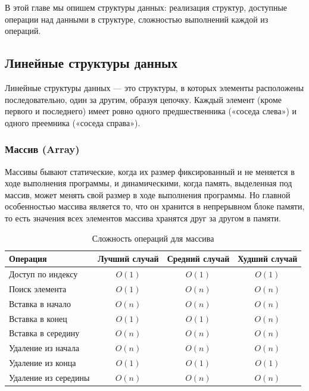 \documentclass[a4paper,12pt]{article}
\begin{document}
В этой главе мы опишем структуры данных: реализация структур, доступные операции над данными в структуре, сложностью выполнений каждой из операций.

\subsection{Линейные структуры данных}
\label{subsec:линейные-структуры-данных}

Линейные структуры данных --- это структуры, в которых элементы расположены последовательно, один за другим, образуя цепочку. Каждый элемент (кроме первого и последнего) имеет ровно одного предшественника («соседа слева») и одного преемника («соседа справа»).

\subsubsection{Массив (Array)}
\label{subsubsec:массив-array}

Массивы бывают статические, когда их размер фиксированный и не меняется в ходе выполнения программы, и динамическими, когда память, выделенная под массив, может менять свой размер в ходе выполнения программы. Но главной особенностью массива является то, что он хранится в непрерывном блоке памяти, то есть значения всех элементов массива хранятся друг за другом в памяти.

\begin{table}[H]
    \centering
    \begin{tabular}{|l|c|c|c|}
        \hline
        Операция & Лучший случай & Средний случай & Худший случай \\
        \hline
        Доступ по индексу & $O(1)$ & $O(1)$ & $O(1)$ \\
        \hline
        Поиск элемента & $O(1)$ & $O(n)$ & $O(n)$ \\
        \hline
        Вставка в начало & $O(n)$ & $O(n)$ & $O(n)$ \\
        \hline
        Вставка в конец & $O(1)$ & $O(1)$ & $O(n)$ \\
        \hline
        Вставка в середину & $O(n)$ & $O(n)$ & $O(n)$ \\
        \hline
        Удаление из начала & $O(n)$ & $O(n)$ & $O(n)$ \\
        \hline
        Удаление из конца & $O(1)$ & $O(1)$ & $O(1)$ \\
        \hline
        Удаление из середины & $O(n)$ & $O(n)$ & $O(n)$ \\
        \hline
    \end{tabular}
    \caption{Сложность операций для массива}
\end{table}
\end{document}
